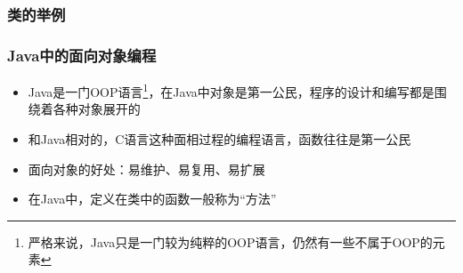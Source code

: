 \begin{frame}
  \frametitle{类的举例}
\end{frame}

\begin{frame}
  \frametitle{Java中的面向对象编程}
  \begin{itemize}
    \item Java是一门OOP语言\footnote{严格来说，Java只是一门较为纯粹的OOP语言，仍然有一些不属于OOP的元素}，在Java中对象是第一公民，程序的设计和编写都是围绕着各种对象展开的
    \item 和Java相对的，C语言这种面相过程的编程语言，函数往往是第一公民
    \item 面向对象的好处：易维护、易复用、易扩展
    \item 在Java中，定义在类中的函数一般称为“方法”
  \end{itemize}
\end{frame}
